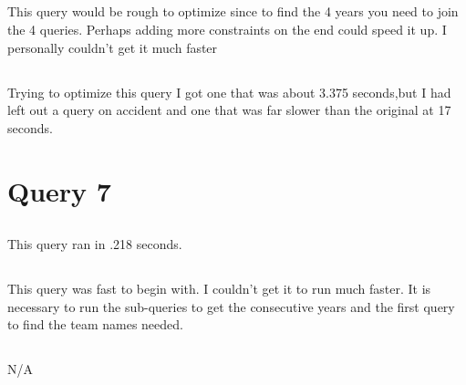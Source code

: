 \documentclass[11pt]{article}
\theoremstyle{plain}
\theoremstyle{definition}
\begin{document}
\subsection{}
This query would be rough to optimize since to find the 4 years you need to join the 4 queries. Perhaps adding more constraints on the end could speed it up. I personally couldn't get it much faster
\subsection{}
Trying to optimize this query I got one that was about 3.375 seconds,but I had left out a query on accident and one that was far slower than the original at 17 seconds.
\section{Query 7}
\subsection{}
This query ran in .218 seconds.
\subsection{}This query was fast to begin with. I couldn't get it to run much faster. It is necessary to run the sub-queries to get the consecutive years and the first query to find the team names needed.
\subsection{}N/A

 
 
 
\end{document}
